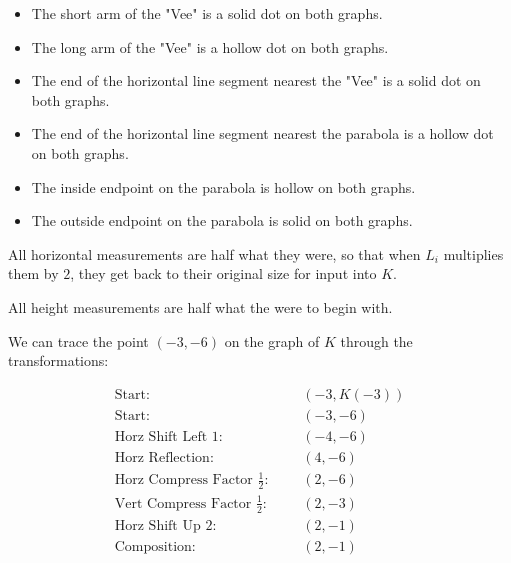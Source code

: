 \documentclass{ximera}
\begin{document}
\begin{itemize}
\item The short arm of the "Vee" is a solid dot on both graphs.
\item The long arm of the "Vee" is a hollow dot on both graphs.
\item The end of the horizontal line segment nearest the "Vee" is a solid dot on both graphs.
\item The end of the horizontal line segment nearest the parabola is a hollow dot on both graphs.
\item The inside endpoint on the parabola is hollow on both graphs.
\item The outside endpoint on the parabola is solid on both graphs.
\end{itemize}










All horizontal measurements are half what they were, so that when $L_i$ multiplies them by $2$, they get back to their original size for input into $K$.

All height measurements are half what the were to begin with.



We can trace the point $(-3, -6)$ on the graph of $K$ through the transformations:





\begin{align*}
\text{Start} : & \text{   } & (-3, K(-3))  \\
\text{Start} : & \text{   } & (-3, -6) \\
\text{Horz Shift Left $1$} : & \text{   } & (-4,-6)   \\
\text{Horz Reflection} : & \text{   } & (4,-6)   \\
\text{Horz Compress Factor $\tfrac{1}{2}$} : & \text{   } & (2,-6)   \\
\text{Vert Compress Factor $\tfrac{1}{2}$} : & \text{   } & (2,-3)   \\
\text{Horz Shift Up $2$} : & \text{   } & (2,-1)   \\
\text{Composition} : & \text{   } & (2,-1)   
\end{align*}
\end{document}
